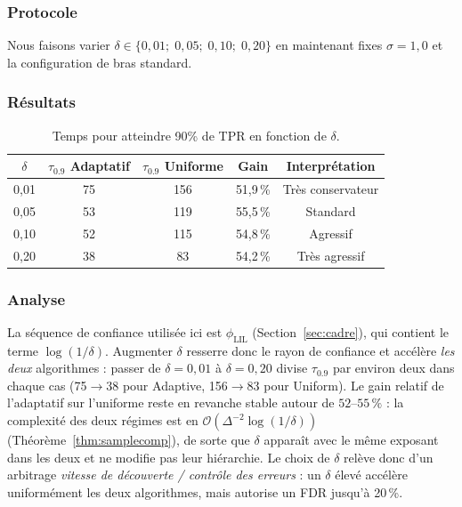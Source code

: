 \documentclass[10.5pt,a4paper]{article}
\begin{document}
\subsubsection{Protocole}

Nous faisons varier $\delta \in \{0{,}01;\; 0{,}05;\; 0{,}10;\; 0{,}20\}$
en maintenant fixes $\sigma = 1{,}0$ et la configuration de bras standard.

\subsubsection{Résultats}

\begin{table}[H]
\centering
\begin{tabular}{ccccc}
\hline
$\delta$ & $\tau_{0.9}$ Adaptatif & $\tau_{0.9}$ Uniforme
         & Gain & Interprétation \\
\hline
0,01 & 75 & 156 & 51,9\,\% & Très conservateur \\
0,05 & 53 & 119 & 55,5\,\% & Standard \\
0,10 & 52 & 115 & 54,8\,\% & Agressif \\
0,20 & 38 &  83 & 54,2\,\% & Très agressif \\
\hline
\end{tabular}
\caption{Temps pour atteindre 90\% de TPR en fonction de $\delta$.}
\label{tab:delta}
\end{table}

\subsubsection{Analyse}

La séquence de confiance utilisée ici est
$\phi_{\mathrm{LIL}}$ (Section~\ref{sec:cadre}), qui contient le
terme $\log(1/\delta)$. Augmenter $\delta$ resserre donc le rayon de
confiance et accélère \emph{les deux} algorithmes : passer de
$\delta=0{,}01$ à $\delta=0{,}20$ divise $\tau_{0.9}$ par environ
deux dans chaque cas (75$\to$38 pour Adaptive, 156$\to$83 pour
Uniform). Le gain relatif de l'adaptatif sur l'uniforme reste en
revanche stable autour de $52$--$55\,\%$ : la complexité des deux régimes est en
$\mathcal{O}(\Delta^{-2}\log(1/\delta))$ (Théorème~\ref{thm:samplecomp}),
de sorte que $\delta$ apparaît avec le même exposant dans les deux
et ne modifie pas leur hiérarchie. Le choix de $\delta$ relève donc
d'un arbitrage \emph{vitesse de découverte / contrôle des erreurs} :
un $\delta$ élevé accélère uniformément les deux algorithmes, mais
autorise un FDR jusqu'à 20\,\%.
\end{document}
